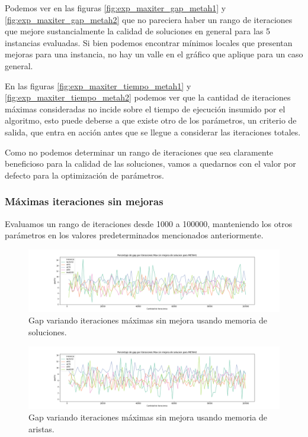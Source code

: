 \documentclass[10pt,a4paper]{article}
\begin{document}
Podemos ver en las figuras \ref{fig:exp_maxiter_gap_metah1} y \ref{fig:exp_maxiter_gap_metah2} que no pareciera haber un rango de iteraciones que mejore sustancialmente la calidad de soluciones en general para las 5 instancias evaluadas. Si bien podemos encontrar mínimos locales que presentan mejoras para una instancia, no hay un valle en el gráfico que aplique para un caso general.

En las figuras \ref{fig:exp_maxiter_tiempo_metah1} y \ref{fig:exp_maxiter_tiempo_metah2} podemos ver que la cantidad de iteraciones máximas consideradas no incide sobre el tiempo de ejecución insumido por el algoritmo, esto puede deberse a que existe otro de los parámetros, un criterio de salida, que entra en acción antes que se llegue a considerar las iteraciones totales.

Como no podemos determinar un rango de iteraciones que sea claramente beneficioso para la calidad de las soluciones, vamos a quedarnos con el valor por defecto para la optimización de parámetros.

\subsubsection{Máximas iteraciones sin mejoras}
Evaluamos un rango de iteraciones desde 1000 a 100000, manteniendo los otros parámetros en los valores predeterminados mencionados anteriormente.

\begin{figure}[h!]
    \centering
    \includegraphics[scale=0.3]{Graphs-metaH/max-iter-sm-gap-METAH1}
    \caption{Gap variando iteraciones máximas sin mejora usando memoria de soluciones.}
    \label{fig:exp_maxiter_sm_gap_metah1}
\end{figure}

\begin{figure}[h!]
    \centering
    \includegraphics[scale=0.3]{Graphs-metaH/max-iter-sm-gap-METAH2}
    \caption{Gap variando iteraciones máximas sin mejora usando memoria de aristas.}
    \label{fig:exp_maxiter_sm_gap_metah2}
\end{figure}
\end{document}
